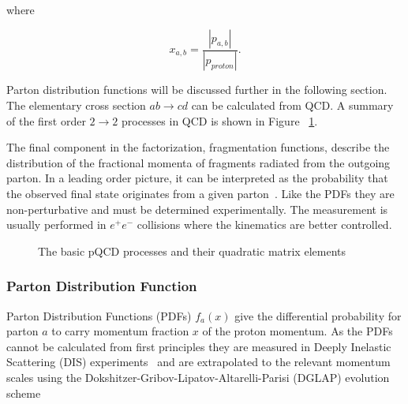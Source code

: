 \noindent where 

\begin{equation}
x_{a,b} = \frac{\left| p_{a,b} \right|}{\left| p_{proton} \right|}.
\end{equation}


Parton distribution functions will be discussed further in the following section. The elementary cross section $ab\rightarrow cd$ can be calculated from QCD. A summary of the first order $2\rightarrow2$ processes in QCD is shown in Figure ~\ref{fig:qcdlo}. 

The final component in the factorization, fragmentation functions, describe the distribution of the fractional momenta of fragments radiated from the outgoing parton.  In a leading order picture, it can be interpreted as the probability that the observed final state originates from a given parton~\cite{Metz:2016swz}. Like the PDFs they are non-perturbative and must be determined experimentally. The measurement is usually performed in $e^+ e^-$ collisions where the kinematics are better controlled. 


%



\begin{figure}[tb]
\centering

\caption[QCD Leading Order]{The basic pQCD processes and their quadratic matrix elements}
\label{fig:qcdlo}
\end{figure}



\subsubsection*{Parton Distribution Function}
Parton Distribution Functions (PDFs) $f_a\left(x\right)$ give the differential probability for parton $a$ to carry momentum fraction $x$ of the proton momentum. %
As the PDFs cannot be calculated from first principles they are measured in Deeply Inelastic Scattering (DIS) experiments~\cite{Placakyte:2011az} and are extrapolated to the relevant momentum scales using the Dokshitzer-Gribov-Lipatov-Altarelli-Parisi (DGLAP) evolution scheme ~\cite{Gribov:1972ri,Altarelli:1977zs,Dokshitzer:1977sg}  %

